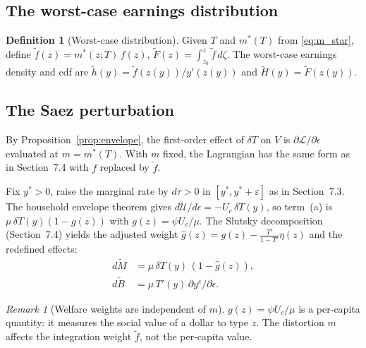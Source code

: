 \documentclass[12pt,a4paper]{article}
\theoremstyle{definition}
\newtheorem{definition}{Definition}[section]
\theoremstyle{plain}
\theoremstyle{remark}
\newtheorem{remark}{Remark}[section]
\newcommand{\zlow}{z_{\scriptscriptstyle 0}}
\newcommand{\calU}{\mathcal{U}}
\newcommand{\calL}{\mathcal{L}}
\begin{document}
\subsection{The worst-case earnings distribution}
\label{sec:worst_case_dist}

\begin{definition}[Worst-case distribution]
\label{def:worst_case}
Given $T$ and $m^*(T)$ from \eqref{eq:m_star}, define
$\widetilde{f}(z) = m^*(z;T)\,f(z)$,
$\widetilde{F}(z) = \int_{\zlow}^z \widetilde{f}\,d\zeta$.
The worst-case earnings density and cdf are
$\widetilde{h}(y) = \widetilde{f}(z(y))/y'(z(y))$ and
$\widetilde{H}(y) = \widetilde{F}(z(y))$.
\end{definition}


\subsection{The Saez perturbation}
\label{sec:saez_perturbation}

By Proposition~\ref{prop:envelope}, the first-order effect
of $\delta T$ on $V$ is $\partial\calL/\partial\epsilon$
evaluated at $m = m^*(T)$.  With $m$ fixed, the Lagrangian
has the same form as in Section~7.4 with $f$ replaced by
$\widetilde{f}$.

Fix $y^* > 0$, raise the marginal rate by $d\tau > 0$
in $[y^*, y^* + \varepsilon]$ as in Section~7.3.
The household envelope theorem gives
$d\calU/d\epsilon = -U_c\,\delta T(y)$, so term~(a) is
$\mu\,\delta T(y)(1-g(z))$ with $g(z) = \psi U_c/\mu$.
The Slutsky decomposition (Section~7.4) yields the
adjusted weight $\hat g(z) = g(z) - \frac{T'}{1-T'}\eta(z)$
and the redefined effects:
\begin{align}
  d\widetilde{M} &= \mu\,\delta T(y)\,(1-\hat g(z)),
  \label{eq:dM} \\
  d\widetilde{B} &= \mu\,T'(y)\,\partial y^c/\partial\epsilon.
  \label{eq:dB}
\end{align}

\begin{remark}[Welfare weights are independent of $m$]
\label{rem:weights}
$g(z) = \psi U_c/\mu$ is a per-capita quantity: it measures
the social value of a dollar to type $z$.  The distortion
$m$ affects the integration weight $\widetilde{f}$, not the
per-capita value.
\end{remark}
\end{document}

